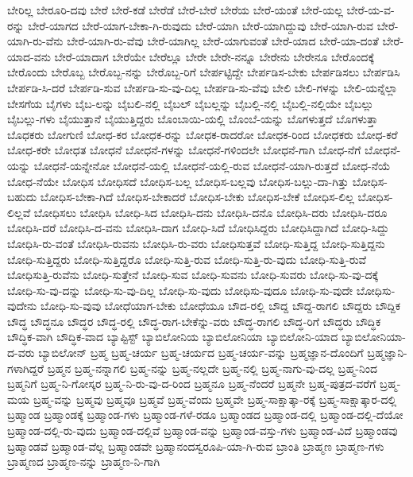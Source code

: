 {ಬೇರಿಲ್ಲ
ಬೇರೂರಿ-ದವು
ಬೇರೆ
ಬೇರೆ-ಕಡೆ
ಬೇರೆಡೆ
ಬೇರೆ-ಬೇರೆ
ಬೇರೆಯ
ಬೇರೆ-ಯಂತೆ
ಬೇರೆ-ಯಲ್ಲ
ಬೇರೆ-ಯ-ವ-ರನ್ನು
ಬೇರೆ-ಯಾಗದ
ಬೇರೆ-ಯಾಗ-ಬೇಕಾ-ಗಿ-ರುವುದು
ಬೇರೆ-ಯಾಗಿ
ಬೇರೆ-ಯಾಗಿದ್ದುವು
ಬೇರೆ-ಯಾಗಿ-ರುವ
ಬೇರೆ-ಯಾಗಿ-ರು-ವೆನು
ಬೇರೆ-ಯಾಗಿ-ರು-ವೆವು
ಬೇರೆ-ಯಾಗಿಲ್ಲ
ಬೇರೆ-ಯಾಗುವಂತೆ
ಬೇರೆ-ಯಾದ
ಬೇರೆ-ಯಾ-ದಂತೆ
ಬೇರೆ-ಯಾದ-ವನು
ಬೇರೆ-ಯಾದಾಗ
ಬೇರೆಯೇ
ಬೇರೆಲ್ಲೂ
ಬೇರೇ
ಬೇರೇ-ನನ್ನೂ
ಬೇರೇನು
ಬೇರೇನೂ
ಬೇರೊಂದಕ್ಕೆ
ಬೇರೊಂದು
ಬೇರೊಬ್ಬ
ಬೇರೊಬ್ಬ-ನನ್ನು
ಬೇರೊಬ್ಬ-ರಿಗೆ
ಬೇರ್ಪಟ್ಟಿದ್ದೇ
ಬೇರ್ಪಡಿಸ-ಬೇಕು
ಬೇರ್ಪಡಿಸಲು
ಬೇರ್ಪಡಿಸಿ
ಬೇರ್ಪಡಿ-ಸಿ-ದರೆ
ಬೇರ್ಪಡಿ-ಸುವ
ಬೇರ್ಪಡಿ-ಸು-ವು-ದಿಲ್ಲ
ಬೇರ್ಪಡಿ-ಸು-ವೆವು
ಬೇಲಿ
ಬೇಲಿ-ಗಳನ್ನು
ಬೇಲಿ-ಯನ್ನೆಲ್ಲಾ
ಬೇಸಗೆಯ
ಬೈಗಳು
ಬೈಬ-ಲನ್ನು
ಬೈಬಲಿ-ನಲ್ಲಿ
ಬೈಬಲ್
ಬೈಬಲ್ಲನ್ನು
ಬೈಬಲ್ಲಿ-ನಲ್ಲಿ
ಬೈಬಲ್ಲಿ-ನಲ್ಲಿಯೇ
ಬೈಬಲ್ಲು
ಬೈಬಲ್ಲು-ಗಳು
ಬೈಯುತ್ತಾನೆ
ಬೈಯುತ್ತಿದ್ದರು
ಬೊಂಬಾಯಿ-ಯಲ್ಲಿ
ಬೊಂಬೆ-ಯನ್ನು
ಬೊಗಳುತ್ತದೆ
ಬೊಗಳುತ್ತಾ
ಬೊಧಕರು
ಬೋಗುಣಿ
ಬೋಧ-ಕರ
ಬೋಧಕ-ರನ್ನು
ಬೋಧಕ-ರಾದರೋ
ಬೋಧಕ-ರಿಂದ
ಬೋಧಕರು
ಬೋಧ-ಕರೆ
ಬೋಧ-ಕರೇ
ಬೋಧತ
ಬೋಧನೆ
ಬೋಧನೆ-ಗಳನ್ನು
ಬೋಧನೆ-ಗಳಿಂದಲೇ
ಬೋಧನೆ-ಗಾಗಿ
ಬೋಧ-ನೆಗೆ
ಬೋಧನೆ-ಯನ್ನು
ಬೋಧನೆ-ಯನ್ನೇನೋ
ಬೋಧನೆ-ಯಲ್ಲಿ
ಬೋಧನೆ-ಯಲ್ಲಿ-ರುವ
ಬೋಧನೆ-ಯಾಗಿ-ರುತ್ತದೆ
ಬೋಧ-ನೆಯೆ
ಬೋಧ-ನೆಯೇ
ಬೋಧಿಸ
ಬೋಧಿಸದೆ
ಬೋಧಿಸ-ಬಲ್ಲ
ಬೋಧಿಸ-ಬಲ್ಲವು
ಬೋಧಿಸ-ಬಲ್ಲು-ದಾ-ಗಿತ್ತು
ಬೋಧಿಸ-ಬಹುದು
ಬೋಧಿಸ-ಬೇಕಾ-ಗಿದೆ
ಬೋಧಿಸ-ಬೇಕಾದರೆ
ಬೋಧಿಸ-ಬೇಕು
ಬೋಧಿಸ-ಬೇಕೆ
ಬೋಧಿಸ-ಲಿಲ್ಲ
ಬೋಧಿಸ-ಲಿಲ್ಲವೆ
ಬೋಧಿಸಲು
ಬೋಧಿಸಿ
ಬೋಧಿ-ಸಿದ
ಬೋಧಿಸಿ-ದನು
ಬೋಧಿಸಿ-ದನೊ
ಬೋಧಿಸಿ-ದರು
ಬೋಧಿಸಿ-ದರೂ
ಬೋಧಿಸಿ-ದರೆ
ಬೋಧಿಸಿ-ದ-ವನು
ಬೋಧಿಸಿ-ದಾಗ
ಬೋಧಿ-ಸಿದೆ
ಬೋಧಿಸಿದ್ದರು
ಬೋಧಿಸಿದ್ದಾಗಿದೆ
ಬೋಧಿ-ಸಿದ್ದು
ಬೋಧಿಸಿ-ರು-ವಂತೆ
ಬೋಧಿಸಿ-ರುವನು
ಬೋಧಿಸಿ-ರು-ವರು
ಬೋಧಿಸುತ್ತವೆ
ಬೋಧಿ-ಸುತ್ತಿದ್ದ
ಬೋಧಿ-ಸುತ್ತಿದ್ದನು
ಬೋಧಿ-ಸುತ್ತಿದ್ದರು
ಬೋಧಿ-ಸುತ್ತಿದ್ದರೊ
ಬೋಧಿ-ಸುತ್ತಿ-ರುವ
ಬೋಧಿ-ಸುತ್ತಿ-ರು-ವುದು
ಬೋಧಿ-ಸುತ್ತಿ-ರುವೆ
ಬೋಧಿಸುತ್ತಿ-ರುವೆನು
ಬೋಧಿ-ಸುತ್ತೇನೆ
ಬೋಧಿ-ಸುವ
ಬೋಧಿ-ಸುವನು
ಬೋಧಿ-ಸುವರು
ಬೋಧಿ-ಸು-ವು-ದಕ್ಕೆ
ಬೋಧಿ-ಸು-ವು-ದನ್ನು
ಬೋಧಿ-ಸು-ವು-ದಿಲ್ಲ
ಬೋಧಿ-ಸು-ವುದು
ಬೋಧಿಸು-ವುದೂ
ಬೋಧಿ-ಸು-ವುದೇ
ಬೋಧಿಸು-ವುದೇನು
ಬೋಧಿ-ಸು-ವುವು
ಬೋಧೆಯಾಗ-ಬೇಕು
ಬೋಧೆಯೂ
ಬೌದ-ರಲ್ಲಿ
ಬೌದ್ದ
ಬೌದ್ದ-ರಾಗಲಿ
ಬೌದ್ದರು
ಬೌದ್ದಿಕ
ಬೌದ್ಧ
ಬೌದ್ಧನೂ
ಬೌದ್ಧರ
ಬೌದ್ಧ-ರಲ್ಲಿ
ಬೌದ್ಧ-ರಾಗ-ಬೇಕೆನ್ನು-ವರು
ಬೌದ್ಧ-ರಾಗಲಿ
ಬೌದ್ಧ-ರಿಗೆ
ಬೌದ್ಧರು
ಬೌದ್ಧಿಕ
ಬೌದ್ಧಿಕ-ವಾಗಿ
ಬೌದ್ಧಿಕ-ವಾದ
ಬ್ಯಾಪ್ಟಿಸ್ಟ್
ಬ್ಯಾಬಿಲೋನಿಯ
ಬ್ಯಾಬಿಲೋನಿಯಾ
ಬ್ಯಾಬಿಲೋನಿ-ಯಾದ
ಬ್ಯಾಬಿಲೋನಿಯಾ-ದ-ವರು
ಬ್ಯಾಬಿಲೋನ್
ಬ್ರಹ್ಮ
ಬ್ರಹ್ಮ-ಚರ್ಯ
ಬ್ರಹ್ಮ-ಚರ್ಯದ
ಬ್ರಹ್ಮ-ಚರ್ಯ-ವನ್ನು
ಬ್ರಹ್ಮಜ್ಞಾನ-ದೊಂದಿಗೆ
ಬ್ರಹ್ಮಜ್ಞಾನಿ-ಗಳಾಗಿದ್ದರೆ
ಬ್ರಹ್ಮನ
ಬ್ರಹ್ಮ-ನನ್ನಾಗಲಿ
ಬ್ರಹ್ಮ-ನನ್ನು
ಬ್ರಹ್ಮ-ನಲ್ಲದೇ
ಬ್ರಹ್ಮ-ನಲ್ಲಿ
ಬ್ರಹ್ಮ-ನಾಗು-ವು-ದಲ್ಲ
ಬ್ರಹ್ಮ-ನಿಂದ
ಬ್ರಹ್ಮನಿಗೆ
ಬ್ರಹ್ಮ-ನಿ-ಗೋಸ್ಕರ
ಬ್ರಹ್ಮ-ನಿ-ರು-ವು-ದ-ರಿಂದ
ಬ್ರಹ್ಮನೂ
ಬ್ರಹ್ಮ-ನೆಂದರೆ
ಬ್ರಹ್ಮನೇ
ಬ್ರಹ್ಮ-ಪುತ್ರದ-ವರೆಗೆ
ಬ್ರಹ್ಮ-ಮಯ
ಬ್ರಹ್ಮ-ವನ್ನು
ಬ್ರಹ್ಮವು
ಬ್ರಹ್ಮವೂ
ಬ್ರಹ್ಮವೆ
ಬ್ರಹ್ಮ-ವೆಂದು
ಬ್ರಹ್ಮವೇ
ಬ್ರಹ್ಮ-ಸಾಕ್ಷಾತ್ಕಾ-ರಕ್ಕೆ
ಬ್ರಹ್ಮ-ಸಾಕ್ಷಾತ್ಕಾರ-ದಲ್ಲಿ
ಬ್ರಹ್ಮಾಂಡ
ಬ್ರಹ್ಮಾಂಡಕ್ಕೆ
ಬ್ರಹ್ಮಾಂಡ-ಗಳು
ಬ್ರಹ್ಮಾಂಡ-ಗಳೆ-ರಡೂ
ಬ್ರಹ್ಮಾಂಡದ
ಬ್ರಹ್ಮಾಂಡ-ದಲ್ಲಿ
ಬ್ರಹ್ಮಾಂಡ-ದಲ್ಲಿ-ದೆಯೋ
ಬ್ರಹ್ಮಾಂಡ-ದಲ್ಲಿ-ರು-ವುದು
ಬ್ರಹ್ಮಾಂಡ-ದಲ್ಲಿವೆ
ಬ್ರಹ್ಮಾಂಡ-ವನ್ನು
ಬ್ರಹ್ಮಾಂಡ-ವಸ್ತು-ಗಳು
ಬ್ರಹ್ಮಾಂಡ-ವಿದೆ
ಬ್ರಹ್ಮಾಂಡವು
ಬ್ರಹ್ಮಾಂಡವೆ
ಬ್ರಹ್ಮಾಂಡ-ವೆಲ್ಲ
ಬ್ರಹ್ಮಾಂಡವೇ
ಬ್ರಹ್ಮಾನಂದಸ್ವರೂಪಿ-ಯಾ-ಗಿ-ರುವ
ಬ್ರಾಂತಿ
ಬ್ರಾಹ್ಮಣ
ಬ್ರಾಹ್ಮಣ-ಗಳು
ಬ್ರಾಹ್ಮಣದ
ಬ್ರಾಹ್ಮಣ-ನನ್ನು
ಬ್ರಾಹ್ಮಣ-ನಿ-ಗಾಗಿ
}
